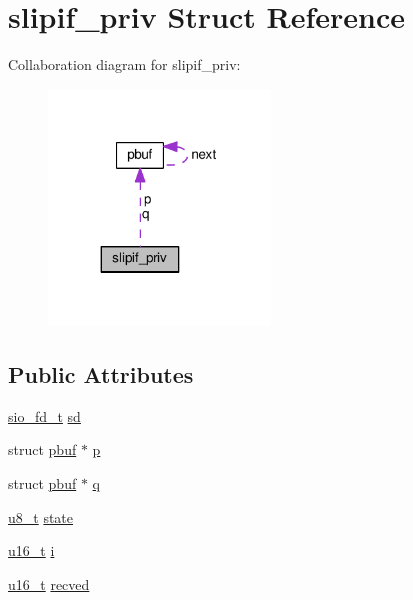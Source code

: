 \hypertarget{structslipif__priv}{}\section{slipif\+\_\+priv Struct Reference}
\label{structslipif__priv}


Collaboration diagram for slipif\+\_\+priv\+:
\nopagebreak
\begin{figure}[H]
\begin{center}
\leavevmode
\includegraphics[width=167pt]{structslipif__priv__coll__graph}
\end{center}
\end{figure}
\subsection*{Public Attributes}
\begin{DoxyCompactItemize}
\item 
\hyperlink{native_2lwip_2src_2include_2lwip_2sio_8h_ac868e938508a529a77cdc81a6765bd0b}{sio\+\_\+fd\+\_\+t} \hyperlink{structslipif__priv_a567c2060169861e255ab2ef6924b5a67}{sd}
\item 
struct \hyperlink{structpbuf}{pbuf} $\ast$ \hyperlink{structslipif__priv_abbbebc97c97e8134373f14546accc244}{p}
\item 
struct \hyperlink{structpbuf}{pbuf} $\ast$ \hyperlink{structslipif__priv_a3284c02e89d2836b5015a036872151bd}{q}
\item 
\hyperlink{group__compiler__abstraction_ga4caecabca98b43919dd11be1c0d4cd8e}{u8\+\_\+t} \hyperlink{structslipif__priv_a60d119227767d9c015e181d4bb20290a}{state}
\item 
\hyperlink{group__compiler__abstraction_ga77570ac4fcab86864fa1916e55676da2}{u16\+\_\+t} \hyperlink{structslipif__priv_ad6c42da5cd8fdf5f21a88dd22d32ffbe}{i}
\item 
\hyperlink{group__compiler__abstraction_ga77570ac4fcab86864fa1916e55676da2}{u16\+\_\+t} \hyperlink{structslipif__priv_a31b1d708af720d13780774a87ab604aa}{recved}
\end{DoxyCompactItemize}


